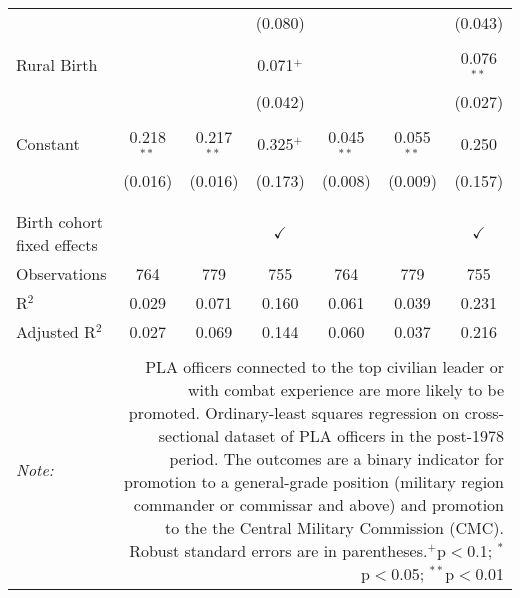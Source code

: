\begin{table}[!htbp]
\begin{tabular}{@{\extracolsep{5pt}}lcccccc}
  &  &  & (0.080) &  &  & (0.043) \\ 
  & & & & & & \\ 
 Rural Birth &  &  & 0.071$^{+}$ &  &  & 0.076$^{**}$ \\ 
  &  &  & (0.042) &  &  & (0.027) \\ 
  & & & & & & \\ 
 Constant & 0.218$^{**}$ & 0.217$^{**}$ & 0.325$^{+}$ & 0.045$^{**}$ & 0.055$^{**}$ & 0.250 \\ 
  & (0.016) & (0.016) & (0.173) & (0.008) & (0.009) & (0.157) \\ 
  & & & & & & \\ 
\hline \\[-1.8ex] 
Birth cohort fixed effects &  &  & $\checkmark$ &  &  & $\checkmark$ \\ 
Observations & 764 & 779 & 755 & 764 & 779 & 755 \\ 
R$^{2}$ & 0.029 & 0.071 & 0.160 & 0.061 & 0.039 & 0.231 \\ 
Adjusted R$^{2}$ & 0.027 & 0.069 & 0.144 & 0.060 & 0.037 & 0.216 \\ 
\hline 
\hline \\[-1.8ex] 
\textit{Note:}  & \multicolumn{6}{r}{PLA officers connected to the top civilian leader or with combat experience are more likely to be promoted. Ordinary-least squares regression on cross-sectional dataset of PLA officers in the post-1978 period. The outcomes are a binary indicator for promotion to a general-grade position (military region commander or commissar and above) and promotion to the the Central Military Commission (CMC). Robust standard errors are in parentheses.$^{+}$p$<$0.1; $^{*}$p$<$0.05; $^{**}$p$<$0.01}} \\ 
\end{tabular} 
\end{table} 
